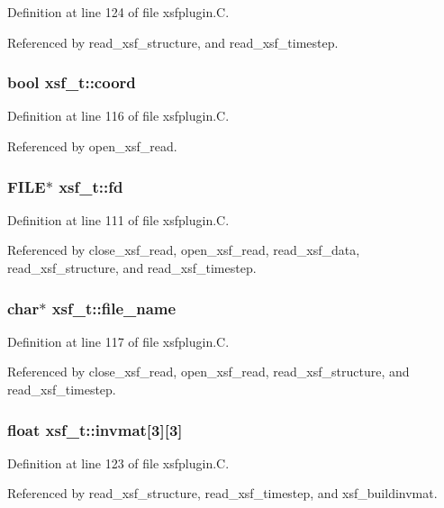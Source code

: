 Definition at line 124 of file xsfplugin.C.

Referenced by read\_\-xsf\_\-structure, and read\_\-xsf\_\-timestep.
\subsubsection{\setlength{\rightskip}{0pt plus 5cm}bool xsf\_\-t::coord}\label{structxsf__t_m5}




Definition at line 116 of file xsfplugin.C.

Referenced by open\_\-xsf\_\-read.
\subsubsection{\setlength{\rightskip}{0pt plus 5cm}FILE$\ast$ xsf\_\-t::fd}\label{structxsf__t_m0}




Definition at line 111 of file xsfplugin.C.

Referenced by close\_\-xsf\_\-read, open\_\-xsf\_\-read, read\_\-xsf\_\-data, read\_\-xsf\_\-structure, and read\_\-xsf\_\-timestep.
\subsubsection{\setlength{\rightskip}{0pt plus 5cm}char$\ast$ xsf\_\-t::file\_\-name}\label{structxsf__t_m6}




Definition at line 117 of file xsfplugin.C.

Referenced by close\_\-xsf\_\-read, open\_\-xsf\_\-read, read\_\-xsf\_\-structure, and read\_\-xsf\_\-timestep.
\subsubsection{\setlength{\rightskip}{0pt plus 5cm}float xsf\_\-t::invmat[3][3]}\label{structxsf__t_m12}




Definition at line 123 of file xsfplugin.C.

Referenced by read\_\-xsf\_\-structure, read\_\-xsf\_\-timestep, and xsf\_\-buildinvmat.
